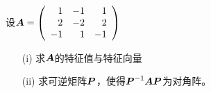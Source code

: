 \begin{frame}[fragile]\ft{\subsecname}  


\begin{li}
  设$\boldsymbol{A}=\left(
    \begin{array}{rrr}
      1&-1&1\\
      2&-2&2\\
      -1&1&-1
    \end{array}
  \right)$
  \begin{itemize}
  \item[(i)]求$\boldsymbol{A}$的特征值与特征向量
  \item[(ii)] 求可逆矩阵$\boldsymbol{P}$，使得$\boldsymbol{P}^{-1}\boldsymbol{A}\boldsymbol{P}$为对角阵。 
  \end{itemize}
\end{li}
\end{frame}

